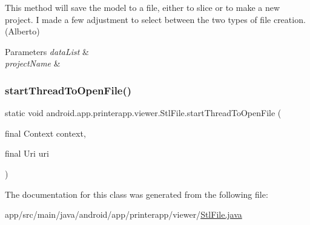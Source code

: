 This method will save the model to a file, either to slice or to make a new project. I made a few adjustment to select between the two types of file creation. (Alberto)


\begin{DoxyParams}{Parameters}
{\em data\+List} & \\
\hline
{\em project\+Name} & \\
\hline
\end{DoxyParams}
\mbox{\label{classandroid_1_1app_1_1printerapp_1_1viewer_1_1_stl_file_aafaa1034510d05373e50a6a206099716}} 
\subsubsection{\texorpdfstring{start\+Thread\+To\+Open\+File()}{startThreadToOpenFile()}}
{\footnotesize\ttfamily static void android.\+app.\+printerapp.\+viewer.\+Stl\+File.\+start\+Thread\+To\+Open\+File (\begin{DoxyParamCaption}\item[{final Context}]{context,  }\item[{final Uri}]{uri }\end{DoxyParamCaption})\hspace{0.3cm}{\ttfamily [static]}}



The documentation for this class was generated from the following file\+:\begin{DoxyCompactItemize}
\item 
app/src/main/java/android/app/printerapp/viewer/\hyperlink{_stl_file_8java}{Stl\+File.\+java}\end{DoxyCompactItemize}
